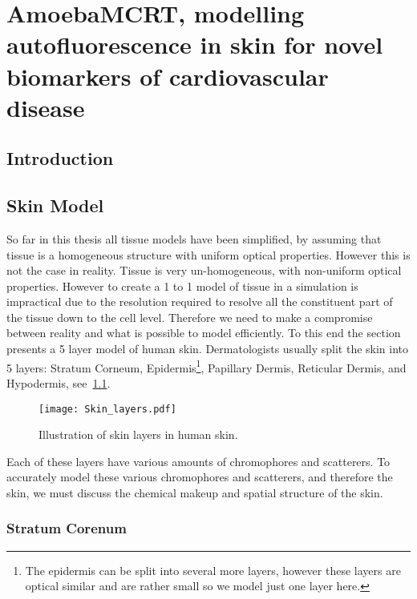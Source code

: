 \chapter{AmoebaMCRT, modelling autofluorescence in skin for novel biomarkers of cardiovascular disease}
\label{chap:salvo}
\section{Introduction}




\section{Skin Model}

So far in this thesis all tissue models have been simplified, by assuming that tissue is a homogeneous structure with uniform optical properties.
However this is not the case in reality.
Tissue is very un-homogeneous, with non-uniform optical properties.
However to create a 1 to 1 model of tissue in a simulation is impractical due to the resolution required to resolve all the constituent part of the tissue down to the cell level.
Therefore we need to make a compromise between reality and what is possible to model efficiently.
To this end the section presents a 5 layer model of human skin. 
Dermatologists usually split the skin into 5 layers: Stratum Corneum, Epidermis\footnote{The epidermis can be split into several more layers, however these layers are optical similar and are rather small so we model just one layer here.}, Papillary Dermis, Reticular Dermis, and Hypodermis, see~\cref{fig:skinexample}.

\begin{figure}[!htpb]
    \centering
    \texttt{[image: Skin\_layers.pdf]}
    \caption{Illustration of skin layers in human skin.}
    \label{fig:skinexample}
\end{figure}

Each of these layers have various amounts of chromophores and scatterers.
To accurately model these various chromophores and scatterers, and therefore the skin, we must discuss the chemical makeup and spatial structure of the skin.

\subsection*{Stratum Corenum} %
\label{sub:stratum}

